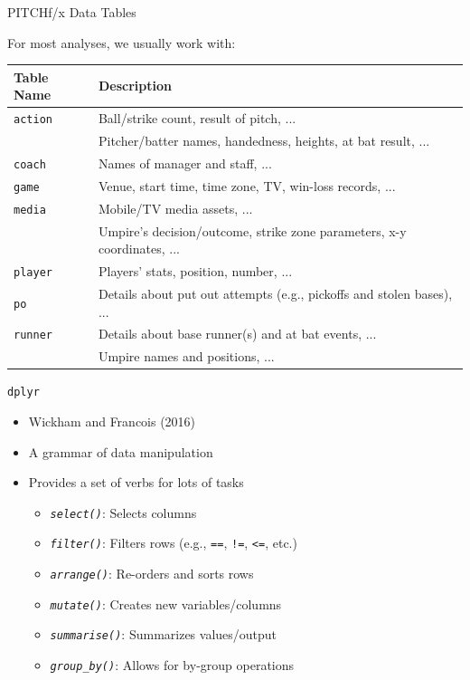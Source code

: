 \documentclass[14pt,ignorenonframetext,aspectratio = 1610]{beamer}
\providecommand{\tightlist}{%
\setlength{\itemsep}{0pt}\setlength{\parskip}{0pt}}
\begin{document}
\begin{frame}{PITCHf/x Data Tables}

For most analyses, we usually work with:

\small

\begin{table}[ht]
\centering
\begin{tabular}{ll}
\hline
Table Name & Description \\ 
\hline
{\texttt{action}} & Ball/strike count, result of pitch, ... \\ 
\rowcolor{SpringGreen}{\texttt{atbat}} & Pitcher/batter names, handedness, heights, at bat result, ... \\ 
{\texttt{coach}} & Names of manager and staff, ... \\ 
{\texttt{game}} & Venue, start time, time zone, TV, win-loss records, ... \\ 
{\texttt{media}} & Mobile/TV media assets, ... \\ 
\rowcolor{SpringGreen}{\texttt{pitch}} & Umpire's decision/outcome, strike zone parameters, x-y coordinates, ... \\ 
{\texttt{player}} & Players' stats, position, number, ... \\ 
{\texttt{po}} & Details about put out attempts (e.g., pickoffs and stolen bases), ... \\ 
{\texttt{runner}} & Details about base runner(s) and at bat events, ... \\ 
\rowcolor{SpringGreen}{\texttt{umpire}} & Umpire names and positions, ... \\ 
\hline
\end{tabular}
\end{table}

\end{frame}

\begin{frame}[fragile]{\texttt{dplyr}}

\begin{itemize}
\tightlist
\item
  Wickham and Francois (2016)
\item
  A grammar of data manipulation
\item
  Provides a set of verbs for lots of tasks

  \begin{itemize}
  \tightlist
  \item
    \emph{\texttt{select()}}: Selects columns
  \item
    \emph{\texttt{filter()}}: Filters rows (e.g., \texttt{==},
    \texttt{!=}, \texttt{\textless{}=}, etc.)
  \item
    \emph{\texttt{arrange()}}: Re-orders and sorts rows
  \item
    \emph{\texttt{mutate()}}: Creates new variables/columns
  \item
    \emph{\texttt{summarise()}}: Summarizes values/output
  \item
    \emph{\texttt{group\_by()}}: Allows for by-group operations
  \end{itemize}
\end{itemize}

\end{frame}
\end{document}
